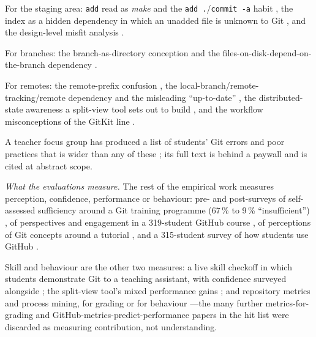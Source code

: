 For the staging area: \texttt{add} read as \emph{make} and the
\texttt{add .}/\texttt{commit -a} habit \autocite{IsomottonenCochez2014},
the index as a hidden dependency in which an unadded file is unknown to
Git \autocite{Church2014HiddenDependencies}, and the design-level misfit
analysis \autocite{DeRossoJackson2016Gitless}.

For branches: the branch-as-directory conception
\autocite{IsomottonenCochez2014} and the files-on-disk-depend-on-the-branch
dependency \autocite{Church2014HiddenDependencies}.

For remotes: the remote-prefix confusion \autocite{IsomottonenCochez2014},
the local-branch/remote-tracking/remote dependency and the misleading
\enquote{up-to-date} \autocite{Church2014HiddenDependencies}, the
distributed-state awareness a split-view tool sets out to build
\autocite{Bucher2026GitTakesTwo}, and the workflow misconceptions of the
GitKit line \autocite{Postner2026GitMisconceptions,Braught2024GitKit}.

A teacher focus group has produced a list of students' Git errors and
poor practices that is wider than any of these
\autocite{Eraslan2020GitErrors}; its full text is behind a paywall and
is cited at abstract scope.

\emph{What the evaluations measure.}
The rest of the empirical work measures perception, confidence,
performance or behaviour: pre- and post-surveys of self-assessed
sufficiency around a Git training programme (67\,\% to 9\,\%
\enquote{insufficient}) \autocite{Jabrayilzade2022InteractiveGit}, of
perspectives and engagement in a 319-student GitHub course
\autocite{Patani2024GitHubImpact}, of perceptions of Git concepts around
a tutorial \autocite{Sproull2022GitIt}, and a 315-student survey of how
students use GitHub \autocite{Tiwari2022GitHubSurvey}.

Skill and behaviour are the other two measures: a live skill checkoff
in which students demonstrate Git to a teaching assistant, with
confidence surveyed alongside \autocite{McMahon2026Checkoffs}; the
split-view tool's mixed performance gains
\autocite{Bucher2026GitTakesTwo}; and repository metrics and process
mining, for grading or for behaviour
\autocite{Hamer2021GitMetrics,Ardimento2022ProcessMining,Cochez2013DVCSUsage}---the
many further metrics-for-grading and GitHub-metrics-predict-performance
papers in the hit list were discarded as measuring contribution, not
understanding.

